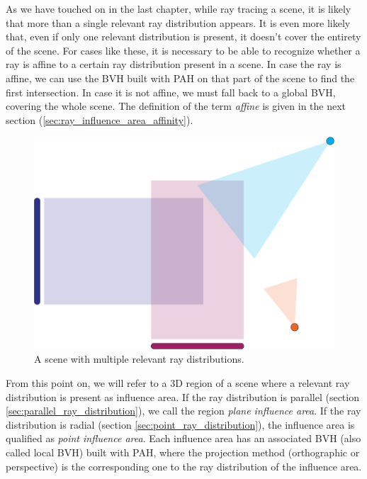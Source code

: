 \documentclass{PoliMi_MasterThesis}
\begin{document}
As we have touched on in the last chapter, while ray tracing a scene, it is likely that more than a single relevant ray distribution appears. It is even more likely that, even if only one relevant distribution is present, it doesn't cover the entirety of the scene. For cases like these, it is necessary to be able to recognize whether a ray is affine to a certain ray distribution present in a scene. In case the ray is affine, we can use the BVH built with PAH on that part of the scene to find the first intersection. In case it is not affine, we must fall back to a global BVH, covering the whole scene. The definition of the term \textit{affine} is given in the next section (\ref{sec:ray_influence_area_affinity}).

\begin{figure}[]
    \centering
    \includegraphics[width=\textwidth*\real{0.55}]{Images/multiple_influence_areas.png}
    \caption{A scene with multiple relevant ray distributions.}
    \label{fig:multiple_ray_distributions}
\end{figure}

From this point on, we will refer to a 3D region of a scene where a relevant ray distribution is present as influence area. If the ray distribution is parallel (section \ref{sec:parallel_ray_distribution}), we call the region \textit{plane influence area}. If the ray distribution is radial (section \ref{sec:point_ray_distribution}), the influence area is qualified as \textit{point influence area}. Each influence area has an associated BVH (also called local BVH) built with PAH, where the projection method (orthographic or perspective) is the corresponding one to the ray distribution of the influence area.
\end{document}
